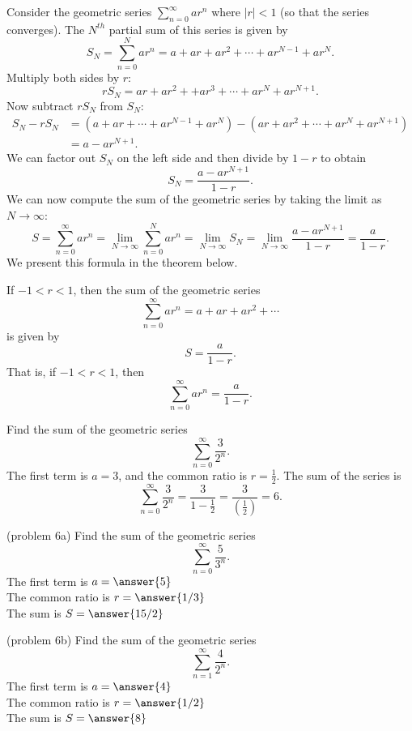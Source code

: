 \documentclass{ximera}
\begin{document}
Consider the geometric series $\sum_{n=0}^\infty ar^n$ where $|r| < 1$ (so that the series converges).
The $N^{th}$ partial sum of this series is given by
\[
S_N = \sum_{n=0}^N ar^n = a + ar + ar^2 + \cdots + ar^{N-1} + ar^N.
\]
Multiply both sides by $r$:
\[
rS_N =  ar + ar^2 + + ar^3 + \cdots  + ar^N + ar^{N+1}.
\] 
Now subtract $rS_N$ from $S_N$:
\begin{align*}
S_N - rS_N &= \left(a + ar + \cdots + ar^{N-1} + ar^N\right) - \left(ar + ar^2 + \cdots  + ar^N + ar^{N+1} \right)\\
           &= a - ar^{N+1}.
\end{align*}
We can factor out $S_N$ on the left side and then divide by $1-r$ to obtain
\[
S_N = \frac{a - ar^{N+1}}{1-r}.
\]
We can now compute the sum of the geometric series by taking the limit as $N \to \infty$:
\[
S = \sum_{n=0}^\infty ar^n = \lim_{N \to \infty} \sum_{n=0}^N ar^n = \lim_{N \to \infty} S_N = \lim_{N \to \infty} \frac{a - ar^{N+1}}{1-r} = \frac{a}{1-r}.
\]
We present this formula in the theorem below.

\begin{theorem}
If $-1 < r < 1$, then the sum of the geometric series 
\[
\sum_{n=0}^\infty ar^n = a + ar + ar^2 + \cdots
\] is given by 
\[
S = \frac{a}{1-r}.
\]
That is, if $-1 < r < 1$, then
\[
\sum_{n=0}^\infty ar^n = \frac{a}{1-r}.
\]
\end{theorem}

\begin{example}[example 6]
Find the sum of the geometric series 
\[
\sum_{n=0}^\infty \frac{3}{2^n}.
\]
The first term is $a = 3$, and the common ratio is $r = \frac12$. The sum of the series is
\[
\sum_{n=0}^\infty \frac{3}{2^n} = \frac{3}{1-\frac12} = \frac{3}{\left(\frac12\right)} = 6.
\]
\end{example}


\begin{problem}(problem 6a)
Find the sum of the geometric series 
\[
\sum_{n=0}^\infty \frac{5}{3^n}.
\]
The first term is $a = \answer{5}$\\
The common ratio is $r = \answer{1/3}$\\
The sum is $S= \answer{15/2}$

\end{problem}

\begin{problem}(problem 6b)
Find the sum of the geometric series 
\[
\sum_{n=1}^\infty \frac{4}{2^n}.
\]
The first term is $a = \answer{4}$\\
The common ratio is $r = \answer{1/2}$\\
The sum is $S= \answer{8}$

\end{problem}
\end{document}
